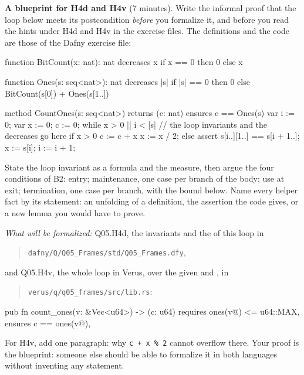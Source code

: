 \documentclass[11pt]{article}
\begin{document}
\begin{problem}\label{prob:B3}
\textbf{A blueprint for H4d and H4v} (7 minutes). Write the informal proof
that the loop below meets its postcondition \emph{before} you formalize it,
and before you read the hints under H4d and H4v in the exercise files. The
definitions and the code are those of the Dafny exercise file:
\begin{dafnycode}
function BitCount(x: nat): nat
  decreases x
{
  if x == 0 then 0 else x %
}

function Ones(s: seq<nat>): nat
  decreases |s|
{
  if |s| == 0 then 0 else BitCount(s[0]) + Ones(s[1..])
}

method CountOnes(s: seq<nat>) returns (c: nat)
  ensures c == Ones(s)
{
  var i := 0;
  var x := 0;
  c := 0;
  while x > 0 || i < |s|
    // the loop invariants and the decreases go here
  {
    if x > 0 {
      c := c + x %
      x := x / 2;
    } else {
      assert s[i..][1..] == s[i + 1..];
      x := s[i];
      i := i + 1;
    }
  }
}
\end{dafnycode}
State the loop invariant as a formula and the measure, then argue the four
conditions of B2: entry; maintenance, one case per branch of the body; use at
exit; termination, one case per branch, with the bound below. Name every
helper fact by its statement: an unfolding of a definition, the assertion the
code gives, or a new lemma you would have to prove.

\emph{What will be formalized:} Q05.H4d, the invariants and the
 of this loop in
\begin{quote}
\texttt{dafny/Q/Q05\_Frames/std/Q05\_Frames.dfy},
\end{quote}
\noindent and Q05.H4v, the whole loop in Verus, over the given
 and , in
\begin{quote}
\texttt{verus/q/q05\_frames/src/lib.rs}:
\end{quote}
\begin{veruscode}
pub fn count_ones(v: &Vec<u64>) -> (c: u64)
    requires
        ones(v@) <= u64::MAX,
    ensures
        c == ones(v@),
\end{veruscode}
For H4v, add one paragraph: why \texttt{c + x \% 2} cannot overflow there. Your
proof is the blueprint: someone else should be able to formalize it in both
languages without inventing any statement.
\end{problem}
\end{document}
